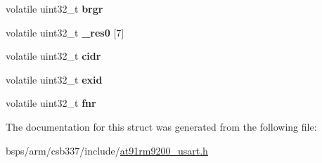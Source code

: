 \begin{DoxyCompactItemize}
\item 
\mbox{\label{structat91rm9200__usart__regs__t_ab4b5da4edbc41f19bf1aff6ea158cf48}} 
volatile uint32\+\_\+t {\bfseries brgr}
\item 
\mbox{\label{structat91rm9200__usart__regs__t_ad7a5c6a30ff878982e0472423f1a7471}} 
volatile uint32\+\_\+t {\bfseries \+\_\+res0} \mbox{[}7\mbox{]}
\item 
\mbox{\label{structat91rm9200__usart__regs__t_ab87a830f6471a1f649628c4173bd53cb}} 
volatile uint32\+\_\+t {\bfseries cidr}
\item 
\mbox{\label{structat91rm9200__usart__regs__t_aa663f12b65879aa817aa559e671e296a}} 
volatile uint32\+\_\+t {\bfseries exid}
\item 
\mbox{\label{structat91rm9200__usart__regs__t_af58bbbf4f53e9ec9dd92b6095b352eb4}} 
volatile uint32\+\_\+t {\bfseries fnr}
\end{DoxyCompactItemize}


The documentation for this struct was generated from the following file\+:\begin{DoxyCompactItemize}
\item 
bsps/arm/csb337/include/\mbox{\hyperlink{at91rm9200__usart_8h}{at91rm9200\+\_\+usart.\+h}}\end{DoxyCompactItemize}
